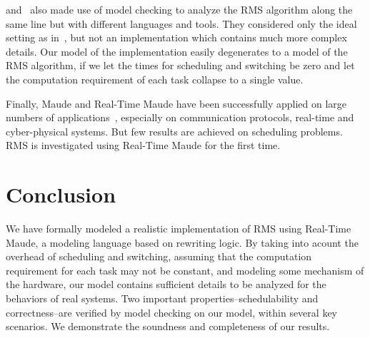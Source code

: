\documentclass[10pt,journal]{IEEEtran}
\newcommand{\hide}[1]{\ignorespaces}
\begin{document}
\cite{DBLP:conf/iceccs/CuiDT14} and~\cite{TianD2011} also made use of
model checking to analyze the RMS algorithm along the same line but
with different languages and tools. They considered only the ideal
setting as in~\cite{DBLP:journals/jacm/LiuL73}, but not an
implementation which contains much more complex details. Our model of
the implementation easily degenerates to a model of the RMS algorithm,
if we let the times for scheduling and switching be zero and let the
computation requirement of each task collapse to a single value.

Finally, Maude and Real-Time Maude have been successfully applied on
large numbers of applications~\cite{DBLP:journals/jlp/Meseguer12},
especially on communication protocols, real-time and cyber-physical
systems. But few results are achieved on scheduling problems. RMS is
investigated using Real-Time Maude for the first time.

\section{Conclusion}
\label{s:conclusion}
We have formally modeled a realistic implementation of RMS using
Real-Time Maude, a modeling language based on rewriting logic. By
taking into acount the overhead of scheduling and switching, assuming
that the computation requirement for each task may not be constant,
and modeling some mechanism of the hardware, our model contains
sufficient details to be analyzed for the behaviors of real
systems. Two important properties--schedulability and correctness--are
verified by model checking on our model, within several key
scenarios. We demonstrate the soundness and completeness of our
results.


\hide{
\ifCLASSOPTIONcompsoc
  \section*{Acknowledgments}
\else
  \section*{Acknowledgment}
\fi

The authors would like to thank...
}

\ifCLASSOPTIONcaptionsoff
  \newpage
\fi
\end{document}
